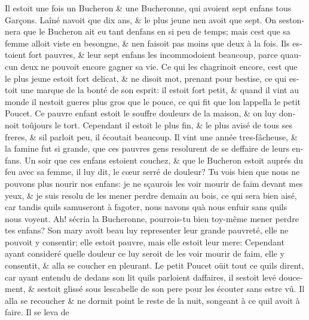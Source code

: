 \documentclass[14pt,a4paper]{memoir}
\begin{document}
\begin{otherlanguage}{french}
Il estoit une fois un Bucheron \& une Bucheronne, qui avoient sept
enfans tous Garçons. L\textquotesingle aîné n\textquotesingle avoit que
dix ans, \& le plus jeune n\textquotesingle en avoit que sept. On
s\textquotesingle estonnera que le Bucheron ait eu tant
d\textquotesingle enfans en si peu de temps; mais c\textquotesingle est
que sa femme alloit viste en besongne, \& n\textquotesingle en faisoit
pas moins que deux à la fois. Ils estoient fort pauvres, \& leur sept
enfans les incommodoient beaucoup, parce qu\textquotesingle aucun
d\textquotesingle eux ne pouvoit encore gagner sa vie. Ce qui les
chagrinoit encore, c\textquotesingle est que le plus jeune estoit fort
delicat, \& ne disoit mot, prenant pour bestise, ce qui estoit une
marque de la bonté de son esprit: il estoit fort petit, \& quand il vint
au monde il n\textquotesingle estoit gueres plus gros que le pouce, ce
qui fit que l\textquotesingle on l\textquotesingle appella le petit
Poucet. Ce pauvre enfant estoit le souffre douleurs de la maison, \& on
luy donnoit toûjours le tort. Cependant il estoit le plus fin, \& le
plus avisé de tous ses freres, \& s\textquotesingle il parloit peu, il
écoutait beaucoup. Il vint une année tres-fâcheuse, \& la famine fut si
grande, que ces pauvres gens resolurent de se deffaire de leurs enfans.
Un soir que ces enfans estoient couchez, \& que le Bucheron estoit
auprés du feu avec sa femme, il luy dit, le cœur serré de douleur? Tu
vois bien que nous ne pouvons plus nourir nos enfans: je ne sçaurois les
voir mourir de faim devant mes yeux, \& je suis resolu de les mener
perdre demain au bois, ce qui sera bien aisé, car tandis
qu\textquotesingle ils s\textquotesingle amuseront à fagoter, nous
n\textquotesingle avons qu\textquotesingle à nous enfuir sans
qu\textquotesingle ils nous voyent. Ah! s\textquotesingle écria la
Bucheronne, pourrois-tu bien toy-même mener perdre tes enfans? Son mary
avoit beau luy representer leur grande pauvreté, elle ne pouvoit y
consentir; elle estoit pauvre, mais elle estoit leur mere: Cependant
ayant consideré quelle douleur ce luy seroit de les voir mourir de faim,
elle y consentit, \& alla se coucher en pleurant. Le petit Poucet oüit
tout ce qu\textquotesingle ils dirent, car ayant entendu de dedans son
lit qu\textquotesingle ils parloient d\textquotesingle affaires, il
s\textquotesingle estoit levé doucement, \& s\textquotesingle estoit
glissé sous l\textquotesingle escabelle de son pere pour les écouter
sans estre vû. Il alla se recoucher \& ne dormit point le reste de la
nuit, songeant à ce qu\textquotesingle il avoit à faire. Il se leva de

\end{otherlanguage}
\end{document}
